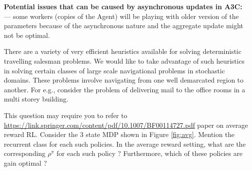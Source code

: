 \documentclass[solution,addpoints,12pt]{exam}
\begin{document}
\begin{questions}
\begin{solution}
 \textbf{Potential issues that can be caused by asynchronous updates in A3C:}
\subitem ---  some workers (copies of the Agent) will be playing with older version of the parameters because of the asynchronous nature and the aggregate update might not be optimal.


\end{solution}

\question[6] There are a variety of very efficient heuristics available for solving deterministic travelling salesman problems. We would like to take advantage of such heuristics in solving
certain classes of large scale navigational problems in stochastic domains. These problems involve navigating from one well demarcated region to another. For e.g., consider
the problem of delivering mail to the office rooms in a multi storey building.


\question[6] This question may require you to refer to \href{this}{https://link.springer.com/content/pdf/10.1007/BF00114727.pdf} paper on average reward RL. Consider the 3 state MDP shown in Figure \ref{fig:avg}.  Mention the recurrent class for each such policies. In the average reward setting, what are the corresponding $\rho^{\pi}$ for each such policy ? Furthermore, which of these policies are gain optimal ? 


\end{questions}
\end{document}
